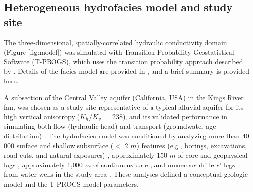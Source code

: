 %
%
\subsection{Heterogeneous hydrofacies model and study site}
\label{ss_2_1}

The three‐dimensional, spatially-correlated hydraulic conductivity domain (Figure \ref{fig:model}) was simulated with Transition Probability Geostatistical Software (T-PROGS), which uses the transition probability approach described by \citet{carle1996transition, carle1997modeling, carle1999tprogs}. Details of the facies model are provided in \citet{weissmann1999three, weissmann1999multi, weissmann2002glacially, weissmann2004influence}, and a brief summary is provided here.

A subsection of the Central Valley aquifer (California, USA) in the Kings River fan, was chosen as a study site representative of a typical alluvial aquifer for its high vertical anisotropy ($K_h/K_v =$ 238), and its validated performance in simulating both flow (hydraulic head) and transport (groundwater age distribution) \citep{weissmann2002dispersion}. The hydrofacies model was conditioned by analyzing more than 40 000 surface and shallow subsurface ($<$ 2 $m$) features (e.g., borings, excavations, road cuts, and natural exposures) \citep{huntington1981soil}, approximately 150 $m$ of core and geophysical logs \citep{burow1997hydrogeologic}, approximately 1,000 $m$ of continuous core \citep{harter2005deep}, and numerous drillers' logs from water wells in the study area \citep{weissmann1999multi}. These analyses defined a conceptual geologic model and the T-PROGS model parameters. 



